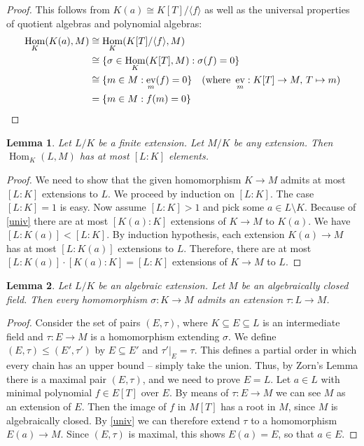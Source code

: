 \documentclass[11pt,reqno]{amsart}
\theoremstyle{standard}
\newtheorem{lemma}{Lemma}[section]
\theoremstyle{definition}
\DeclareMathOperator{\Hom}{Hom}
\DeclareMathOperator{\ev}{ev}
\begin{document}
\begin{proof}
This follows from $K(a) \cong K[T]/\langle f \rangle$ as well as the universal properties of quotient algebras and polynomial algebras:
\begin{align*}
\Hom_K(K(a),M) & \cong \Hom_K(K[T]/\langle f \rangle,M) \\
& \cong \{\sigma \in \Hom_K(K[T],M) : \sigma(f) = 0\} \\
& \cong \{m \in M : \ev_m(f) = 0\} \quad (\text{where } \ev_m : K[T] \to M,\, T \mapsto m) \\
& = \{m \in M : f(m) = 0\} \qedhere
\end{align*}
\end{proof}

\begin{lemma} \label{atmost}
Let $L/K$ be a finite extension. Let $M/K$ be any extension. Then $\Hom_K(L,M)$ has at most $[L:K]$ elements.
\end{lemma}

\begin{proof}
We need to show that the given homomorphism $K \to M$ admits at most $[L:K]$ extensions to $L$. We proceed by induction on $[L:K]$. The case $[L:K]=1$ is easy. Now assume $[L:K] > 1$ and pick some $a \in L \setminus K$. Because of \cref{univ} there are at most $[K(a):K]$ extensions of $K \to M$ to $K(a)$. We have $[L:K(a)] < [L:K]$. By induction hypothesis, each extension $K(a) \to M$ has at most $[L:K(a)]$ extensions to $L$. Therefore, there are at most $[L:K(a)] \cdot [K(a):K] = [L:K]$ extensions of $K \to M$ to $L$.
\end{proof}

\begin{lemma}\label{extend}
Let $L/K$ be an algebraic extension. Let $M$ be an algebraically closed field. Then every homomorphism $\sigma : K \to M$ admits an extension $\tau : L \to M$.
\end{lemma}

\begin{proof}
Consider the set of pairs $(E,\tau)$, where $K \subseteq E \subseteq L$ is an intermediate field and $\tau : E \to M$ is a homomorphism extending $\sigma$. We define $(E,\tau) \leq (E',\tau')$ by $E \subseteq E'$ and $\tau'|_E = \tau$. This defines a partial order in which every chain has an upper bound -- simply take the union. Thus, by Zorn's Lemma there is a maximal pair $(E,\tau)$, and we need to prove $E = L$. Let $a \in L$ with minimal polynomial $f \in E[T]$ over $E$. By means of $\tau : E \to M$ we can see $M$ as an extension of $E$. Then the image of $f$ in $M[T]$ has a root in $M$, since $M$ is algebraically closed. By \cref{univ} we can therefore extend $\tau$ to a homomorphism $E(a) \to M$. Since $(E,\tau)$ is maximal, this shows $E(a) = E$, so that $a \in E$.
\end{proof}
\end{document}
